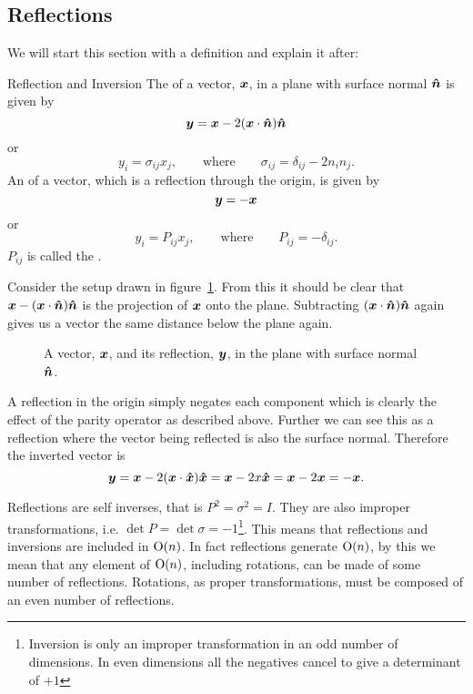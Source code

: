 \subsection{Reflections}
We will start this section with a definition and explain it after:
\begin{definition}{Reflection and Inversion}{}
    The  of a vector, \(\bm{x}\), in a plane with surface normal \(\bm{\hat{n}}\) is given by
    \[\bm{y} = \bm{x} - 2(\bm{x}\cdot\bm{\hat{n}})\bm{\hat{n}}\]
    or
    \[y_i = \sigma_{ij}x_j, \qquad\text{where}\qquad \sigma_{ij} = \delta_{ij} - 2n_in_j.\]
    An  of a vector, which is a reflection through the origin, is given by
    \[\bm{y} = -\bm{x}\]
    or
    \[y_i = P_{ij}x_j, \qquad\text{where}\qquad P_{ij} = -\delta_{ij}.\]
    \(P_{ij}\) is called the .
\end{definition}
Consider the setup drawn in figure~\ref{fig:reflected vector}.
From this it should be clear that \(\bm{x} - (\bm{x}\cdot\bm{\hat{n}})\bm{\hat{n}}\) is the projection of \(\bm{x}\) onto the plane.
Subtracting \((\bm{x}\cdot\bm{\hat{n}})\bm{\hat{n}}\) again gives us a vector the same distance below the plane again.
\begin{figure}[ht]
    \centering
    \caption{A vector, \(\bm{x}\), and its reflection, \(\bm{y}\), in the plane with surface normal \(\bm{\hat{n}}\).}
    \label{fig:reflected vector}
\end{figure}

A reflection in the origin simply negates each component which is clearly the effect of the parity operator as described above.
Further we can see this as a reflection where the vector being reflected is also the surface normal.
Therefore the inverted vector is
\[\bm{y} = \bm{x} - 2(\bm{x}\cdot\bm{\hat{x}})\bm{\hat{x}} = \bm{x} - 2x\bm{\hat{x}} = \bm{x} - 2\bm{x} = -\bm{x}.\]

Reflections are self inverses, that is \(P^2 = \sigma^2 = I\).
They are also improper transformations, i.e. \(\det P = \det\sigma = -1\)\footnote{Inversion is only an improper transformation in an odd number of dimensions. In even dimensions all the negatives cancel to give a determinant of \(+1\)}.
This means that reflections and inversions are included in \(\mathrm{O}(n)\).
In fact reflections generate \(\mathrm{O}(n)\), by this we mean that any element of \(\mathrm{O}(n)\), including rotations, can be made of some number of reflections.
Rotations, as proper transformations, must be composed of an even number of reflections.

